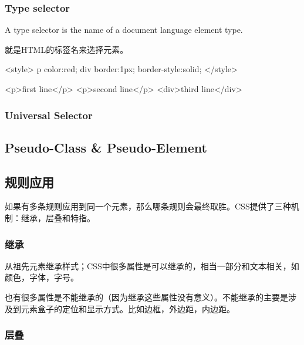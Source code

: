 \subsubsection{Type selector}

A type selector is the name of a document language element type.

就是HTML的标签名来选择元素。

\begin{CSS}
<style>
p {color:red;}
div {border:1px; border-style:solid;}
</style>

<p>first line</p>
<p>second line</p>
<div>third line</div>
\end{CSS}


\subsubsection{Universal Selector}


\subsection{Pseudo-Class \& Pseudo-Element}





\subsection{规则应用}

如果有多条规则应用到同一个元素，那么哪条规则会最终取胜。CSS提供了三种机制：继承，层叠和特指。


\subsubsection{继承}

从祖先元素继承样式；CSS中很多属性是可以继承的，相当一部分和文本相关，如颜色，字体，字号。

也有很多属性是不能继承的（因为继承这些属性没有意义）。不能继承的主要是涉及到元素盒子的定位和显示方式。比如边框，外边距，内边距。

\subsubsection{层叠}

